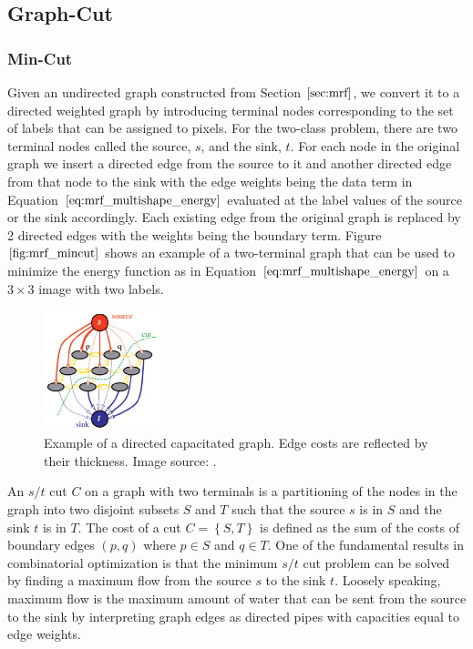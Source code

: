 \documentclass{SMBV12}
\begin{document}
\subsection{Graph-Cut}
\label{sec:graph_cut}
\subsubsection{Min-Cut}

Given an undirected graph constructed from Section $\ref{sec:mrf}$, we convert it to a directed weighted graph by introducing terminal nodes corresponding to the set of labels that can be assigned to pixels. For the two-class problem, there are two terminal nodes called the source, $s$, and the sink, $t$. For each node in the original graph we insert a directed edge from the source to it and another directed edge from that node to the sink with the edge weights being the data term in Equation $\ref{eq:mrf_multishape_energy}$ evaluated at the label values of the source or the sink accordingly. Each existing edge from the original graph is replaced by 2 directed edges with the weights being the boundary term. Figure $\ref{fig:mrf_mincut}$ shows an example of a two-terminal graph that can be used to minimize the energy function as in Equation $\ref{eq:mrf_multishape_energy}$ on a $3 \times 3$ image with two labels.

\begin{figure}[htbp]
    \centering
    \includegraphics[width=0.3\textwidth]{images/mincut.png}
    \caption{Example of a directed capacitated graph. Edge costs are reflected by their thickness. Image source: \cite{boykov2004experimental}.}
    \label{fig:mrf_mincut}
\end{figure}

An $s/t$ cut $C$ on a graph with two terminals is a partitioning of the nodes in the graph into two disjoint subsets $S$ and $T$ such that the source $s$ is in $S$ and the sink $t$ is in $T$. The cost of a cut $C = \left\lbrace S, T \right\rbrace $ is defined as the sum of the costs of boundary edges $(p, q)$ where $p \in S$ and $q \in T$. One of the fundamental results in combinatorial optimization is that the minimum $s/t$ cut problem can be solved by finding a maximum flow from the source $s$ to the sink $t$. Loosely speaking, maximum flow is the maximum amount of water that can be sent from the source to the sink by interpreting graph edges as directed pipes with capacities equal to edge weights.
\end{document}

